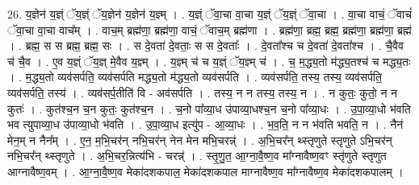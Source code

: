 \documentclass[17pt]{extarticle}
\begin{document}
26. य॒ज्ञेन॑ य॒ज्ञ्ं ॅय॒ज्ञ्ं ॅय॒ज्ञेन॑ य॒ज्ञेन॑ य॒ज्ञ्म् । . य॒ज्ञ्ं ॅवा॒चा वा॒चा य॒ज्ञ्ं ॅय॒ज्ञ्ं ॅवा॒चा । . वा॒चा वाचं॒ ॅवाचं॑ ॅवा॒चा वा॒चा वाच᳚म् । . वाच॒म् ब्रह्म॑णा॒ ब्रह्म॑णा॒ वाचं॒ ॅवाच॒म् ब्रह्म॑णा । . ब्रह्म॑णा॒ ब्रह्म॒ ब्रह्म॒ ब्रह्म॑णा॒ ब्रह्म॑णा॒ ब्रह्म॑ । . ब्रह्म॒ स स ब्रह्म॒ ब्रह्म॒ सः । . स दे॒वता॑ दे॒वताः॒ स स दे॒वताः᳚ । . दे॒वता᳚श्च च दे॒वता॑ दे॒वता᳚श्च । . चै॒वैव च॑ चै॒व । . ए॒व य॒ज्ञ्ं ॅय॒ज्ञ् मे॒वैव य॒ज्ञ्म् । . य॒ज्ञ्म् च॑ च य॒ज्ञ्ं ॅय॒ज्ञ्म् च॑ । . च॒ म॒द्ध्य॒तो म॑द्ध्य॒तश्च॑ च मद्ध्य॒तः । . म॒द्ध्य॒तो व्यव॑सर्पति॒ व्यव॑सर्पति मद्ध्य॒तो म॑द्ध्य॒तो व्यव॑सर्पति । . व्यव॑सर्पति॒ तस्य॒ तस्य॒ व्यव॑सर्पति॒ व्यव॑सर्पति॒ तस्य॑ । . व्यव॑सर्प॒तीति॑ वि - अव॑सर्पति । . तस्य॒ न न तस्य॒ तस्य॒ न । . न कुतः॒ कुतो॒ न न कुतः॑ । . कुत॑श्च॒न च॒न कुतः॒ कुत॑श्च॒न । . च॒नो पा᳚व्या॒ध उ॑पाव्या॒धश्च॒न च॒नो पा᳚व्या॒धः । . उ॒पा॒व्या॒धो भ॑वति भव त्युपाव्या॒ध उ॑पाव्या॒धो भ॑वति । . उ॒पा॒व्या॒ध इत्यु॑प - आ॒व्या॒धः । . भ॒व॒ति॒ न न भ॑वति भवति॒ न । . नैन॑ मेन॒म् न नैन᳚म् । . ए॒न॒ म॒भि॒चर॑न् नभि॒चर॑न् नेन मेन मभि॒चरन्न्॑ । . अ॒भि॒चर᳚न् थ्स्तृणुते स्तृणुते ऽभि॒चर॑न् नभि॒चर᳚न् थ्स्तृणुते । . अ॒भि॒चर॒न्नित्य॑भि - चरन्न्॑ । . स्तृ॒णु॒त॒ आ॒ग्ना॒वै॒ष्ण॒व मा᳚ग्नावैष्ण॒वꣳ स्तृ॑णुते स्तृणुत आग्नावैष्ण॒वम् । . आ॒ग्ना॒वै॒ष्ण॒व मेका॑दशकपाल॒ मेका॑दशकपाल माग्नावैष्ण॒व मा᳚ग्नावैष्ण॒व मेका॑दशकपालम् । \newline
\end{document}
